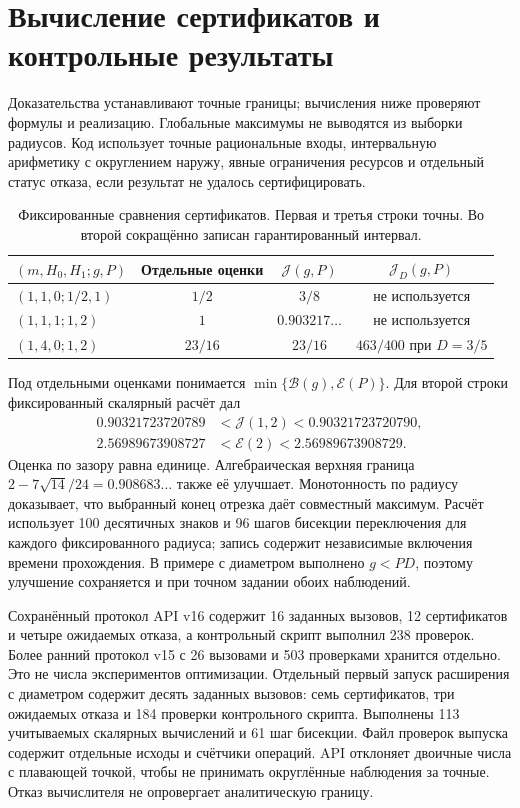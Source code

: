 \section{Вычисление сертификатов и контрольные результаты}
\label{compact:evidence}
Доказательства устанавливают точные границы; вычисления ниже
проверяют формулы и реализацию. Глобальные максимумы не выводятся
из выборки радиусов. Код использует точные рациональные входы,
интервальную арифметику с округлением наружу, явные ограничения
ресурсов и отдельный статус отказа, если результат не удалось
сертифицировать.

\begin{table}[htbp]
\centering
\caption{Фиксированные сравнения сертификатов. Первая и третья строки
точны. Во второй сокращённо записан гарантированный интервал.}
\label{compact:certificate-table}
\begin{tabular}{lccc}
\toprule
$(m,H_0,H_1;g,P)$ & Отдельные оценки & $\mathcal J(g,P)$ & $\mathcal J_D(g,P)$\\
\midrule
$(1,1,0;1/2,1)$ & $1/2$ & $3/8$ & не используется\\
$(1,1,1;1,2)$ & $1$ & $0.903217\ldots$ & не используется\\
$(1,4,0;1,2)$ & $23/16$ & $23/16$ & $463/400$ при $D=3/5$\\
\bottomrule
\end{tabular}
\end{table}
Под отдельными оценками понимается
$\min\{\mathcal B(g),\mathcal E(P)\}$.
Для второй строки фиксированный скалярный расчёт дал
\[
 \begin{aligned}
 0.90321723720789&<\mathcal J(1,2)<0.90321723720790,\\
 2.56989673908727&<\mathcal E(2)<2.56989673908729.
 \end{aligned}
\]
Оценка по зазору равна единице. Алгебраическая верхняя граница
$2-7\sqrt{14}/24=0.908683\ldots$ также её улучшает.
Монотонность по радиусу доказывает, что выбранный конец отрезка
даёт совместный максимум. Расчёт использует 100 десятичных знаков
и 96 шагов бисекции переключения для каждого фиксированного
радиуса; запись содержит независимые включения времени прохождения.
В примере с диаметром выполнено $g<PD$, поэтому улучшение сохраняется
и при точном задании обоих наблюдений.

Сохранённый протокол API v16 содержит 16 заданных вызовов,
12 сертификатов и четыре ожидаемых отказа, а контрольный скрипт
выполнил 238 проверок. Более ранний протокол v15 с 26 вызовами
и 503 проверками хранится отдельно. Это не числа экспериментов
оптимизации. Отдельный первый запуск расширения с диаметром
содержит десять заданных вызовов: семь сертификатов, три ожидаемых
отказа и 184 проверки контрольного скрипта. Выполнены 113 учитываемых
скалярных вычислений и 61 шаг бисекции. Файл проверок выпуска
содержит отдельные исходы и счётчики операций.
API отклоняет двоичные числа с плавающей точкой,
чтобы не принимать округлённые наблюдения за точные.
Отказ вычислителя не опровергает аналитическую границу.

